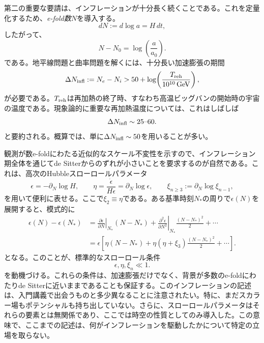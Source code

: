 \documentclass[a4paper,11pt,oneside]{article}
\theoremstyle{definition}
\numberwithin{equation}{section}
\begin{document}
第二の重要な要請は、インフレーションが十分長く続くことである。これを定量化するため、\textit{e-fold数}\(N\)を導入する。
\begin{equation}
dN := d\log a = H\,dt ,
\end{equation}
したがって、
\begin{equation}
N-N_0=\log\!\left(\frac{a}{a_0}\right) .
\end{equation}
である。地平線問題と曲率問題を解くには、十分長い加速膨張の期間
\begin{equation}
\Delta N_{\rm infl}:=N_e-N_i
>
50+\log\!\left(\frac{T_{\rm reh}}{10^{10}\,{\rm GeV}}\right) ,
\end{equation}
が必要である。$ T_{\rm reh}$は再加熱の終了時、すなわち高温ビッグバンの開始時の宇宙の温度である。現象論的に重要な再加熱温度については、これはしばしば
\begin{equation}
\Delta N_{\rm infl}\sim 25\text{--}60 .
\end{equation}
と要約される。概算では、単に\(\Delta N_{\rm infl}\sim 50\)を用いることが多い。



観測が数e-foldにわたる近似的なスケール不変性を示すので、インフレーション期全体を通じてde Sitterからのずれが小さいことを要求するのが自然である。これは、高次のHubbleスローロールパラメータ
\begin{equation}
\epsilon = -\partial_N\log H ,
\qquad
\eta = \frac{\dot\epsilon}{H\epsilon}=\partial_N\log\epsilon ,
\qquad
\xi_{n\ge 3}:=\partial_N\log\xi_{n-1} ,
\end{equation}
を用いて便利に表せる。ここで\(\xi_2\equiv \eta\)である。ある基準時刻\(N_\ast\)の周りで\(\epsilon(N)\)を展開すると、模式的に
\begin{align}
\epsilon(N)-\epsilon(N_\ast)
&=
\left.\frac{\partial\epsilon}{\partial N}\right|_{N_\ast}(N-N_\ast)
+\left.\frac{\partial^2\epsilon}{\partial N^2}\right|_{N_\ast}\frac{(N-N_\ast)^2}{2}
+\cdots
\nonumber\\
&=
\epsilon\left[
\eta(N-N_\ast)
+\eta(\eta+\xi_3)\frac{(N-N_\ast)^2}{2}
+\cdots
\right] .
\end{align}
となる。このことが、標準的なスローロール条件
\begin{equation}
\epsilon,\eta,\xi_n \ll 1 .
\end{equation}
を動機づける。これらの条件は、加速膨張だけでなく、背景が多数のe-foldにわたりde Sitterに近いままであることも保証する。このインフレーションの記述は、入門講義で出会うものと多少異なることに注意されたい。特に、まだスカラー場もポテンシャルも持ち出していない。さらに、スローロールパラメータはそれらの要素とは無関係であり、ここでは時空の性質としてのみ導入した。この意味で、ここまでの記述は、何がインフレーションを駆動したかについて特定の立場を取らない。\\
\end{document}
